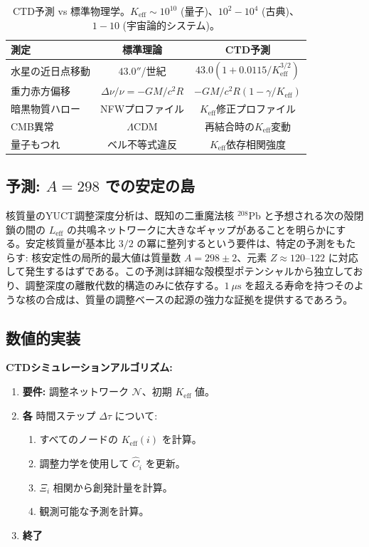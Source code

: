 \documentclass[11pt,a4paper]{article}
\begin{document}
	\begin{table}[htbp]
		\centering
		
			\begin{tabular}{lcc}
				\toprule
				\textbf{測定} & \textbf{標準理論} & \textbf{CTD予測} \\
				\midrule
				水星の近日点移動 & $43.0''$/世紀 & $43.0(1 + 0.0115/K_{\mathrm{eff}}^{3/2})$ \\
				重力赤方偏移 & $\Delta\nu/\nu = -GM/c^2R$ & $-GM/c^2R(1 - \gamma/K_{\mathrm{eff}})$ \\
				暗黒物質ハロー & NFWプロファイル & $K_{\mathrm{eff}}$修正プロファイル \\
				CMB異常 & $\Lambda$CDM & 再結合時の$K_{\mathrm{eff}}$変動 \\
				量子もつれ & ベル不等式違反 & $K_{\mathrm{eff}}$依存相関強度 \\
				\bottomrule
			\end{tabular}
		
		\caption{CTD予測 vs 標準物理学。$K_{\mathrm{eff}} \sim 10^{10}$ (量子)、$10^2-10^4$ (古典)、$1-10$ (宇宙論的システム)。}
	\end{table}
	
	\subsection{予測: $A=298$ での安定の島}
	
	核質量のYUCT調整深度分析は、既知の二重魔法核 $^{208}\mathrm{Pb}$ と予想される次の殻閉鎖の間の $L_{\mathrm{eff}}$ の共鳴ネットワークに大きなギャップがあることを明らかにする。安定核質量が基本比 $3/2$ の冪に整列するという要件は、特定の予測をもたらす: 核安定性の局所的最大値は質量数 $A = 298 \pm 2$、元素 $Z \approx 120$--$122$ に対応して発生するはずである。この予測は詳細な殻模型ポテンシャルから独立しており、調整深度の離散代数的構造のみに依存する。$1\ \mu\text{s}$ を超える寿命を持つそのような核の合成は、質量の調整ベースの起源の強力な証拠を提供するであろう。
	
	\subsection{数値的実装}
	
	\textbf{CTDシミュレーションアルゴリズム:}
	\begin{enumerate}
		\item \textbf{要件:} 調整ネットワーク $\mathcal{N}$、初期 $K_{\mathrm{eff}}$ 値。
		\item \textbf{各} 時間ステップ $\Delta\tau$ について:
		\begin{enumerate}
			\item すべてのノードの $K_{\mathrm{eff}}(i)$ を計算。
			\item 調整力学を使用して $\hat{C}_i$ を更新。
			\item $\Xi_i$ 相関から創発計量を計算。
			\item 観測可能な予測を計算。
		\end{enumerate}
		\item \textbf{終了}
	\end{enumerate}
	
\end{document}
